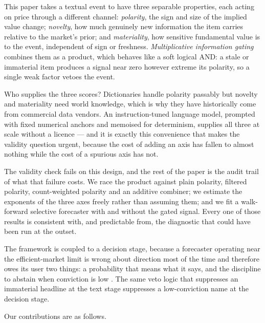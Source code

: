 This paper takes a textual event to have three separable properties, each acting
on price through a different channel: \emph{polarity}, the sign and size of the
implied value change; \emph{novelty}, how much genuinely new information the item
carries relative to the market's prior; and \emph{materiality}, how sensitive
fundamental value is to the event, independent of sign or freshness.
\emph{Multiplicative information gating} combines them as a product, which
behaves like a soft logical AND: a stale or immaterial item produces a signal
near zero however extreme its polarity, so a single weak factor vetoes the event.

Who supplies the three scores? Dictionaries handle polarity passably
\citep{loughran2011} but novelty and materiality need world knowledge, which is
why they have historically come from commercial data vendors. An instruction-tuned
language model, prompted with fixed numerical anchors and memoised for
determinism, supplies all three at scale without a licence --- and it is exactly
this convenience that makes the validity question urgent, because the cost of
adding an axis has fallen to almost nothing while the cost of a spurious axis has
not.

The validity check fails on this design, and the rest of the paper is the audit
trail of what that failure costs. We race the product against plain polarity,
filtered polarity, count-weighted polarity and an additive combiner; we estimate
the exponents of the three axes freely rather than assuming them; and we fit a
walk-forward selective forecaster with and without the gated signal. Every one of
those results is consistent with, and predictable from, the diagnostic that could
have been run at the outset.

The framework is coupled to a decision stage, because a forecaster operating near
the efficient-market limit \citep{fama1970} is wrong about direction most of the
time and therefore owes its user two things: a probability that means what it
says, and the discipline to abstain when conviction is low
\citep{chow1970,geifman2017}. The same veto logic that suppresses an immaterial
headline at the text stage suppresses a low-conviction name at the decision
stage.

Our contributions are as follows.

